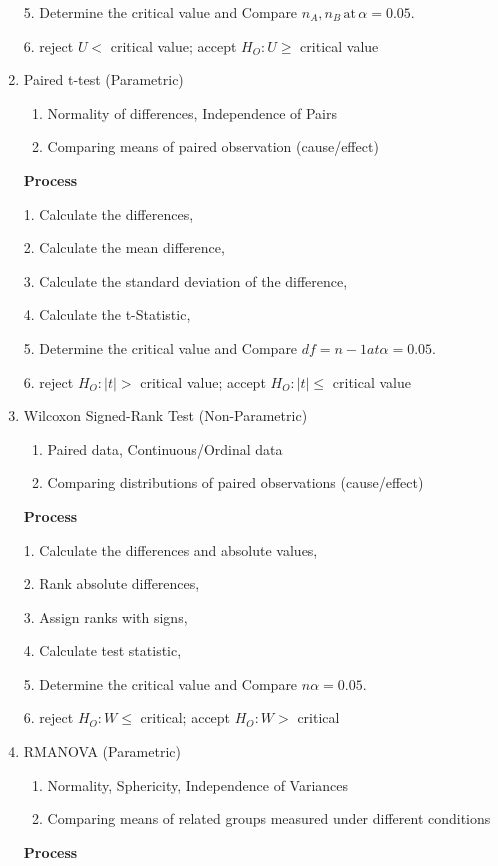 \documentclass[4pt]{article}
\begin{document}
\begin{multicols*}{2}
\begin{enumerate}
            5. Determine the critical value and Compare $n_A, n_B \, \text{at} \, \alpha = 0.05$.

            6. reject $U <$ critical value; accept $H_O: U \geq$ critical value


        \item Paired t-test (Parametric)
        \begin{enumerate}
            \item Normality of differences, Independence of Pairs
            \item Comparing means of paired observation (cause/effect)
        \end{enumerate}
        \textbf{Process}

            1. Calculate the differences,

            2. Calculate the mean difference, 

            3. Calculate the standard deviation of the difference, 

            4. Calculate the t-Statistic,

            5. Determine the critical value and Compare $df = n - 1 at \alpha = 0.05$.

            6. reject $H_O: |t| >$ critical value; accept $H_O: |t| \leq$ critical value


        \item Wilcoxon Signed-Rank Test (Non-Parametric)
        \begin{enumerate}
            \item Paired data, Continuous/Ordinal data
            \item Comparing distributions of paired observations (cause/effect)
        \end{enumerate}
        \textbf{Process}

            1. Calculate the differences and absolute values,

            2. Rank absolute differences, 

            3. Assign ranks with signs,

            4. Calculate test statistic,

            5. Determine the critical value and Compare $n \alpha = 0.05$.
            
            6. reject $H_O: W \leq$ critical; accept $H_O: W >$ critical

        \item RMANOVA (Parametric)
        \begin{enumerate}
            \item Normality, Sphericity, Independence of Variances
            \item Comparing means of related groups measured under different conditions
        \end{enumerate}
        \textbf{Process}


\end{enumerate}
\end{multicols*}
\end{document}
